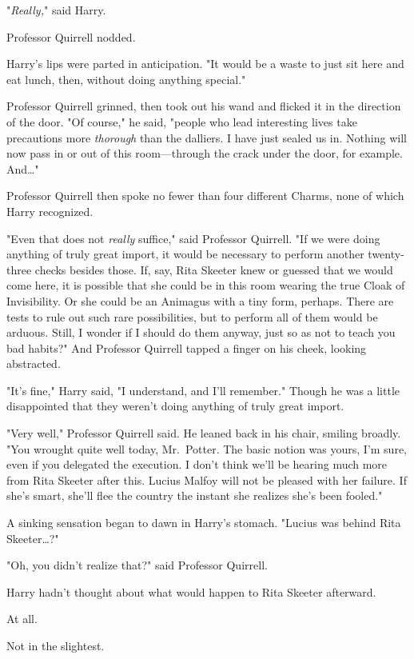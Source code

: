 "\emph{Really,}" said Harry.

Professor Quirrell nodded.

Harry's lips were parted in anticipation. "It would be a waste to just sit here 
and eat lunch, then, without doing anything special."

Professor Quirrell grinned, then took out his wand and flicked it in the 
direction of the door. "Of course," he said, "people who lead interesting lives 
take precautions more \emph{thorough} than the dalliers. I have just sealed us 
in. Nothing will now pass in or out of this room---through the crack under the 
door, for example. And{\ldots}"

Professor Quirrell then spoke no fewer than four different Charms, none of 
which Harry recognized.

"Even that does not \emph{really} suffice," said Professor Quirrell. "If we 
were doing anything of truly great import, it would be necessary to perform 
another twenty-three checks besides those. If, say, Rita Skeeter knew or 
guessed that we would come here, it is possible that she could be in this room 
wearing the true Cloak of Invisibility. Or she could be an Animagus with a tiny 
form, perhaps. There are tests to rule out such rare possibilities, but to 
perform all of them would be arduous. Still, I wonder if I should do them 
anyway, just so as not to teach you bad habits?" And Professor Quirrell tapped 
a finger on his cheek, looking abstracted.

"It's fine," Harry said, "I understand, and I'll remember." Though he was a 
little disappointed that they weren't doing anything of truly great import.

"Very well," Professor Quirrell said. He leaned back in his chair, smiling 
broadly. "You wrought quite well today, Mr.~Potter. The basic notion was yours, 
I'm sure, even if you delegated the execution. I don't think we'll be hearing 
much more from Rita Skeeter after this. Lucius Malfoy will not be pleased with 
her failure. If she's smart, she'll flee the country the instant she realizes 
she's been fooled."

A sinking sensation began to dawn in Harry's stomach. "Lucius was behind Rita 
Skeeter{\ldots}?"

"Oh, you didn't realize that?" said Professor Quirrell.

Harry hadn't thought about what would happen to Rita Skeeter afterward.

At all.

Not in the slightest.

